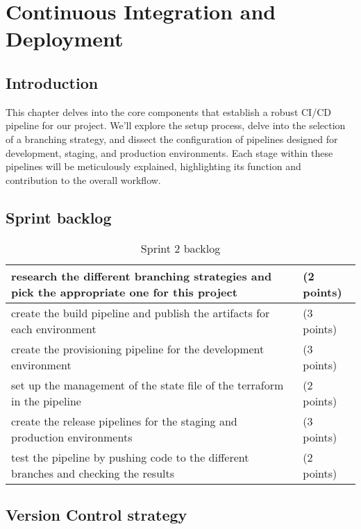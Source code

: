 \chapter{Continuous Integration and Deployment}

\section*{Introduction}
This chapter delves into the core components that establish a robust CI/CD pipeline for our project. We'll explore the setup process, delve into the selection of a branching strategy, and dissect the configuration of pipelines designed for development, staging, and production environments. Each stage within these pipelines will be meticulously explained, highlighting its function and contribution to the overall workflow.
\section{Sprint backlog}
\begin{longtable}[c]{
    |p{}|
    p{}|
    }
    \caption{Sprint 2 backlog}
    \label{tab:Sprint2_backlog}                                                                            \\
    \hline
    research the different branching strategies and pick the appropriate one for this project & (2 points) \\
    \hline
    create the build pipeline and publish the artifacts for each environment                  & (3 points) \\
    \hline
    create the provisioning pipeline for the development environment                          & (3 points) \\
    \hline
    set up the management of the state file of the terraform in the pipeline                  & (2 points) \\
    \hline
    create the release pipelines for the staging and production environments                  & (3 points) \\
    \hline
    test the pipeline by pushing code to the different branches and checking the results      & (2 points) \\
    \hline
\end{longtable}

\section{Version Control strategy}

